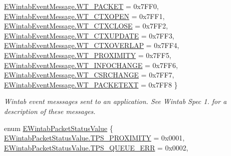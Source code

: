 \begin{DoxyCompactItemize}
\mbox{\hyperlink{namespace_wintab_d_n_a4b98724153acf19dc7b44dc911e7fd0da5e95613ce2527a446d9ee3e10fe5be2c}{E\+Wintab\+Event\+Message.\+W\+T\+\_\+\+P\+A\+C\+K\+ET}} = 0x7\+F\+F0, 
\mbox{\hyperlink{namespace_wintab_d_n_a4b98724153acf19dc7b44dc911e7fd0da66563739a7673e139b15ecbe3f3cb070}{E\+Wintab\+Event\+Message.\+W\+T\+\_\+\+C\+T\+X\+O\+P\+EN}} = 0x7\+F\+F1, 
\mbox{\hyperlink{namespace_wintab_d_n_a4b98724153acf19dc7b44dc911e7fd0daf846b2579d39425c3fe0fe99295e2468}{E\+Wintab\+Event\+Message.\+W\+T\+\_\+\+C\+T\+X\+C\+L\+O\+SE}} = 0x7\+F\+F2, 
\mbox{\hyperlink{namespace_wintab_d_n_a4b98724153acf19dc7b44dc911e7fd0da648ab71e6134daaf33ea9e0cb4bf964f}{E\+Wintab\+Event\+Message.\+W\+T\+\_\+\+C\+T\+X\+U\+P\+D\+A\+TE}} = 0x7\+F\+F3, 
\newline
\mbox{\hyperlink{namespace_wintab_d_n_a4b98724153acf19dc7b44dc911e7fd0daa886d4222e1c460af87c692cee3f37de}{E\+Wintab\+Event\+Message.\+W\+T\+\_\+\+C\+T\+X\+O\+V\+E\+R\+L\+AP}} = 0x7\+F\+F4, 
\mbox{\hyperlink{namespace_wintab_d_n_a4b98724153acf19dc7b44dc911e7fd0da6eddf7611875138581fbe38874b39591}{E\+Wintab\+Event\+Message.\+W\+T\+\_\+\+P\+R\+O\+X\+I\+M\+I\+TY}} = 0x7\+F\+F5, 
\mbox{\hyperlink{namespace_wintab_d_n_a4b98724153acf19dc7b44dc911e7fd0dac079adb185c52e56ecd97b614e9645c2}{E\+Wintab\+Event\+Message.\+W\+T\+\_\+\+I\+N\+F\+O\+C\+H\+A\+N\+GE}} = 0x7\+F\+F6, 
\mbox{\hyperlink{namespace_wintab_d_n_a4b98724153acf19dc7b44dc911e7fd0da63fa7928d9cbd4eb040bfe38b3b18edb}{E\+Wintab\+Event\+Message.\+W\+T\+\_\+\+C\+S\+R\+C\+H\+A\+N\+GE}} = 0x7\+F\+F7, 
\newline
\mbox{\hyperlink{namespace_wintab_d_n_a4b98724153acf19dc7b44dc911e7fd0da713ddca3660017276e227f39450f3c76}{E\+Wintab\+Event\+Message.\+W\+T\+\_\+\+P\+A\+C\+K\+E\+T\+E\+XT}} = 0x7\+F\+F8
 \}
\begin{DoxyCompactList}\small\item\em Wintab event messsages sent to an application. See Wintab Spec 1. for a description of these messages. \end{DoxyCompactList}\item 
enum \mbox{\hyperlink{namespace_wintab_d_n_afe14d17b83fb34685a298d857c203cac}{E\+Wintab\+Packet\+Status\+Value}} \{ \newline
\mbox{\hyperlink{namespace_wintab_d_n_afe14d17b83fb34685a298d857c203caca94d2fbc94052d403edeb48e33deaab5d}{E\+Wintab\+Packet\+Status\+Value.\+T\+P\+S\+\_\+\+P\+R\+O\+X\+I\+M\+I\+TY}} = 0x0001, 
\mbox{\hyperlink{namespace_wintab_d_n_afe14d17b83fb34685a298d857c203caca453a492937569cfa4e919f1de9a1eaa8}{E\+Wintab\+Packet\+Status\+Value.\+T\+P\+S\+\_\+\+Q\+U\+E\+U\+E\+\_\+\+E\+RR}} = 0x0002, 

\end{DoxyCompactItemize}
